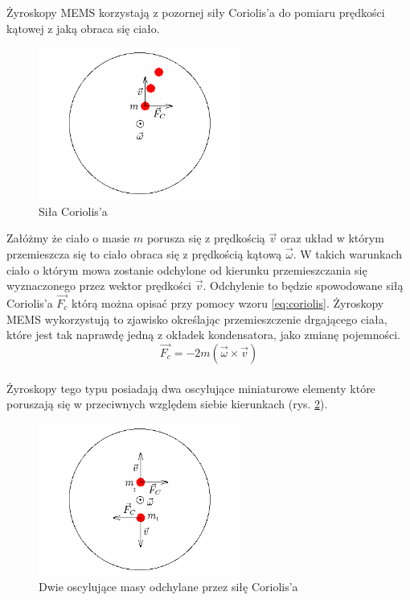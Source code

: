 Żyroskopy MEMS korzystają z pozornej siły Coriolis'a do pomiaru prędkości kątowej
z jaką obraca się ciało. \begin{figure}[!ht]
 \centering \includegraphics[height=50mm]{../images/ch04/coriolis.png}
 \caption{Siła Coriolis'a}
 \label{fig:Coriolis}
\end{figure}
Załóżmy że ciało o masie $m$ porusza się z prędkością $\vec{v}$ oraz układ w
którym przemieszcza się to ciało obraca się z prędkością kątową $\vec{\omega}$. W
takich warunkach ciało o którym mowa zostanie odchylone od kierunku
przemieszczania się wyznaczonego przez wektor prędkości $\vec{v}$. Odchylenie to
będzie spowodowane siłą Coriolis'a $\vec{F_{c}}$ którą można opisać przy pomocy
wzoru \ref{eq:coriolis}. Żyroskopy MEMS wykorzystują to zjawisko określając
przemieszczenie drgającego ciała, które jest tak naprawdę jedną z okładek
kondensatora, jako zmianę pojemności.
\begin{equation}
  \label{eq:coriolis}
  \vec{F_{c}} = -2m \left(\vec{\omega}\times\vec{v}\right)
\end{equation}
\\
Żyroskopy tego typu posiadają dwa oscylujące miniaturowe elementy które poruszają się w przeciwnych względem siebie kierunkach (rys. \ref{fig:ZyroCoriolis}). 
\begin{figure}[!ht]
 \centering
 \includegraphics[height=50mm]{../images/ch04/gyro-coriolis.png}
 \caption{Dwie oscylujące masy odchylane przez siłę Coriolis'a}
 \label{fig:ZyroCoriolis}
\end{figure}
